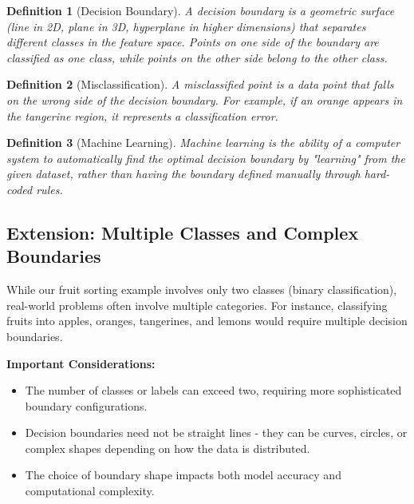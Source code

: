 \documentclass[12pt,a4paper]{article}
\theoremstyle{directpoint}
\newtheorem*{definition}{Definition}
\theoremstyle{definition}
\begin{document}
\begin{definition}[Decision Boundary]
A decision boundary is a geometric surface (line in 2D, plane in 3D, hyperplane in higher dimensions) that separates different classes in the feature space. Points on one side of the boundary are classified as one class, while points on the other side belong to the other class.
\end{definition}

\begin{definition}[Misclassification]
A misclassified point is a data point that falls on the wrong side of the decision boundary. For example, if an orange appears in the tangerine region, it represents a classification error.
\end{definition}

\begin{definition}[Machine Learning]
Machine learning is the ability of a computer system to automatically find the optimal decision boundary by "learning" from the given dataset, rather than having the boundary defined manually through hard-coded rules.
\end{definition}

\subsection{Extension: Multiple Classes and Complex Boundaries}

While our fruit sorting example involves only two classes (binary classification), real-world problems often involve multiple categories. For instance, classifying fruits into apples, oranges, tangerines, and lemons would require multiple decision boundaries.

\textbf{Important Considerations:}
\begin{itemize}
    \item The number of classes or labels can exceed two, requiring more sophisticated boundary configurations.
    \item Decision boundaries need not be straight lines - they can be curves, circles, or complex shapes depending on how the data is distributed.
    \item The choice of boundary shape impacts both model accuracy and computational complexity.
\end{itemize}
\end{document}
